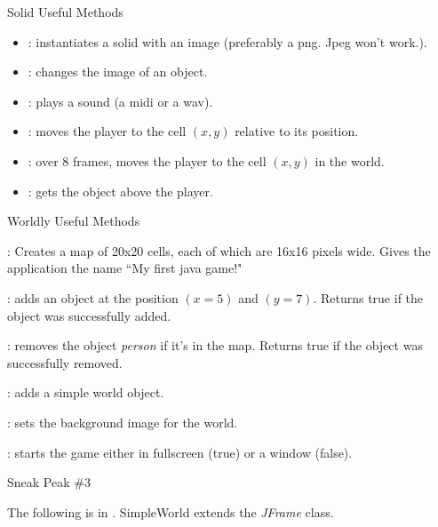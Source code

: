\begin{frame}{Solid Useful Methods}
\begin{itemize}
\item {}: instantiates a solid with an image (preferably a png. Jpeg won't work.).\pause
\item {}: changes the image of an object.\pause
\item {}: plays a sound (a midi or a wav).\pause
\item {}: moves the player to the cell $(x, y)$ relative to its position.\pause
\item {}: over 8 frames, moves the player to the cell $(x, y)$ in the world.\pause
\item {}: gets the object above the player.
\end{itemize}
\end{frame}

\begin{frame}{Worldly Useful Methods}
\begin{itemize}{\small
\item {}: Creates a map of 20x20 cells, each of which are 16x16 pixels wide. Gives the application the name ``My first java game!"\pause
\item {}: adds an object at the position $(x = 5)$ and $(y = 7)$. Returns true if the object was successfully added.\pause
\item {}: removes the object \emph{person} if it's in the map. Returns true if the object was successfully removed.\pause
\item {}: adds a simple world object.\pause
\item {}: sets the background image for the world.\pause
\item {}: starts the game either in fullscreen (true) or a window (false).
}\end{itemize}
\end{frame}

\begin{frame}[fragile]{Sneak Peak \#3}
\begin{center}The following is in . SimpleWorld extends the \emph{JFrame} class.\end{center}
\begin{semiverbatim}\end{semiverbatim}
\end{frame}
